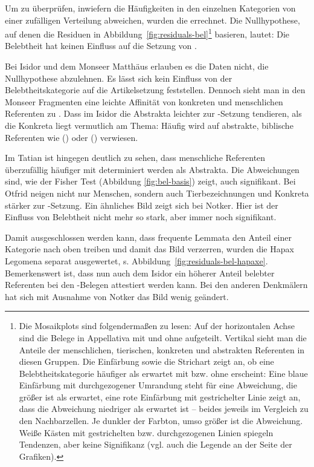 Um zu überprüfen, inwiefern die Häufigkeiten in den einzelnen Kategorien von einer zufälligen Verteilung abweichen, wurden die  \parencite{Gries2012} errechnet. Die Nullhypothese, auf denen die Residuen in Abbildung~\ref{fig:residuals-bel}\footnote{ 
Die Mosaikplots sind folgendermaßen zu lesen: Auf der horizontalen Achse sind die Belege in Appellativa mit und ohne  aufgeteilt. Vertikal sieht man die Anteile der menschlichen, tierischen, konkreten und abstrakten Referenten in diesen Gruppen. Die Einfärbung sowie die Strichart zeigt an, ob eine Belebtheitskategorie häufiger als erwartet mit bzw. ohne  erscheint: Eine blaue Einfärbung mit durchgezogener Umrandung steht für eine Abweichung, die größer ist als erwartet, eine rote Einfärbung mit gestrichelter Linie zeigt an, dass die Abweichung niedriger als erwartet ist -- beides jeweils im Vergleich zu den Nachbarzellen. Je dunkler der Farbton, umso größer ist die Abweichung. Weiße Kästen mit gestrichelten bzw. durchgezogenen Linien spiegeln Tendenzen, aber keine Signifikanz (vgl. auch die Legende an der Seite der Grafiken).} basieren, lautet: Die Belebtheit hat keinen Einfluss auf die Setzung von . 

Bei Isidor und dem Monseer Matthäus erlauben es die Daten nicht, die Nullhypothese abzulehnen. Es lässt sich kein Einfluss von der Belebtheitskategorie auf die Artikelsetzung feststellen. Dennoch sieht man in den Monseer Fragmenten eine leichte Affinität von konkreten und menschlichen Referenten zu . Dass im Isidor die Abstrakta leichter zur -Setzung tendieren, als die Konkreta liegt vermutlich am Thema: Häufig wird auf abstrakte, biblische Referenten wie  () oder   () verwiesen.
 
Im Tatian ist hingegen deutlich zu sehen, dass menschliche Referenten überzufällig häufiger mit  determiniert werden als Abstrakta. Die Abweichungen sind, wie der Fisher Test (Abbildung \ref{fig:bel-basis}) zeigt, auch signifikant. Bei Otfrid neigen nicht nur Menschen, sondern auch  Tierbezeichnungen und Konkreta stärker zur -Setzung. Ein ähnliches Bild zeigt sich bei Notker. Hier ist der Einfluss von Belebtheit nicht mehr so stark, aber immer noch signifikant.    

Damit ausgeschlossen werden kann, dass frequente Lemmata den Anteil einer Kategorie nach oben treiben und damit das Bild verzerren, wurden die Hapax Legomena separat ausgewertet, s. Abbildung~\ref{fig:residuals-bel-hapaxe}. Bemerkenswert ist, dass nun auch dem Isidor ein höherer Anteil belebter Referenten bei den -Belegen attestiert werden kann. Bei den anderen Denkmälern hat sich mit Ausnahme von Notker das Bild wenig geändert. 

